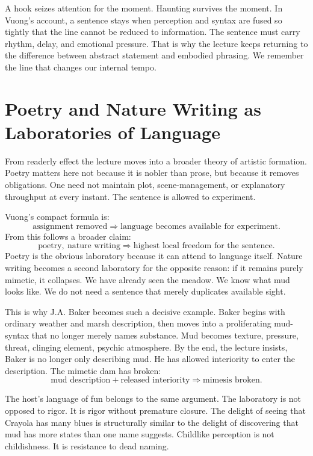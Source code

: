 A hook seizes attention for the moment. Haunting survives the moment. In Vuong's account, a sentence stays when perception and syntax are fused so tightly that the line cannot be reduced to information. The sentence must carry rhythm, delay, and emotional pressure. That is why the lecture keeps returning to the difference between abstract statement and embodied phrasing. We remember the line that changes our internal tempo.

\section{Poetry and Nature Writing as Laboratories of Language}

From readerly effect the lecture moves into a broader theory of artistic formation. Poetry matters here not because it is nobler than prose, but because it removes obligations. One need not maintain plot, scene-management, or explanatory throughput at every instant. The sentence is allowed to experiment.

Vuong's compact formula is:
\begin{equation}
\text{assignment removed} \Longrightarrow \text{language becomes available for experiment}.
\end{equation}
From this follows a broader claim:
\begin{equation}
\text{poetry},\ \text{nature writing} \Longrightarrow \text{highest local freedom for the sentence}.
\end{equation}
Poetry is the obvious laboratory because it can attend to language itself. Nature writing becomes a second laboratory for the opposite reason: if it remains purely mimetic, it collapses. We have already seen the meadow. We know what mud looks like. We do not need a sentence that merely duplicates available sight.

This is why J.A. Baker becomes such a decisive example. Baker begins with ordinary weather and marsh description, then moves into a proliferating mud-syntax that no longer merely names substance. Mud becomes texture, pressure, threat, clinging element, psychic atmosphere. By the end, the lecture insists, Baker is no longer only describing mud. He has allowed interiority to enter the description. The mimetic dam has broken:
\begin{equation}
\text{mud description} + \text{released interiority} \Longrightarrow \text{mimesis broken}.
\end{equation}

The host's language of fun belongs to the same argument. The laboratory is not opposed to rigor. It is rigor without premature closure. The delight of seeing that Crayola has many blues is structurally similar to the delight of discovering that mud has more states than one name suggests. Childlike perception is not childishness. It is resistance to dead naming.

